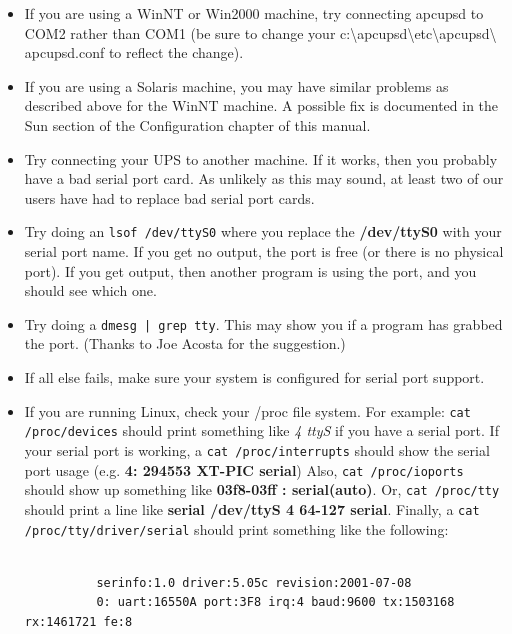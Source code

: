\begin{itemize}
Add the following to the end of the line: /NoSerialMice:COM1 (or COM2) so that
the new line looks like:  

\footnotesize
\begin{verbatim}
          
          multi(0)disk(0)rdisk(0)partition(1)\WINNT="Windows NT Workstation Version 4.00" /NoSerialMice:COM1
     
\end{verbatim}
\normalsize

\item If you are using a WinNT or Win2000 machine, try connecting apcupsd to
COM2 rather than COM1 (be sure to change your
c:\textbackslash{}apcupsd\textbackslash{}etc\textbackslash{}apcupsd\textbackslash
{}apcupsd.conf to reflect the change).  
\item If you are using a Solaris machine, you may have similar problems as
described above for the WinNT machine. A possible fix is documented in the Sun
section of the Configuration chapter of this manual.  
\item Try connecting your UPS to another machine. If it works, then you
probably have a bad serial port card. As unlikely as this may sound, at least
two of our users have had to replace bad serial port cards.  
\item Try doing an {\tt lsof /dev/ttyS0} where you replace the {\bf
/dev/ttyS0} with your serial port name. If you get no output, the port is free
(or there is no physical port). If you get output, then another program is
using the port, and you should see which one.  
\item Try doing a {\tt dmesg | grep tty}. This may show you if a program has
grabbed the port. (Thanks to Joe Acosta for the suggestion.)  
\item If all else fails, make sure your system is configured for serial port
support.  
\item If you are running Linux, check your /proc file system. For example:
{\tt cat /proc/devices} should print something like {\it 4 ttyS} if you have a
serial port. If your serial port is working, a {\tt cat /proc/interrupts}
should show the serial port usage (e.g. {\bf 4: 294553 XT-PIC serial}) Also,
{\tt cat /proc/ioports} should show up something like {\bf 03f8-03ff :
serial(auto)}. Or, {\tt cat /proc/tty} should print a line like {\bf serial
/dev/ttyS 4 64-127 serial}. Finally, a {\tt cat /proc/tty/driver/serial}
should print something like the following:  

\footnotesize
\begin{verbatim}
          
          serinfo:1.0 driver:5.05c revision:2001-07-08
          0: uart:16550A port:3F8 irq:4 baud:9600 tx:1503168 rx:1461721 fe:8
     
\end{verbatim}
\normalsize

\end{itemize}

